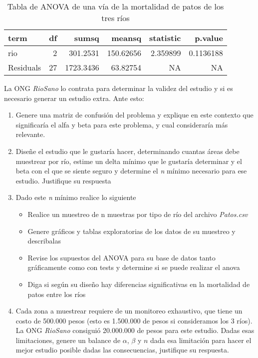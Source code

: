 \documentclass[]{book}
\providecommand{\tightlist}{%
  \setlength{\itemsep}{0pt}\setlength{\parskip}{0pt}}
\begin{document}
\begin{table}

\caption{\label{tab:unnamed-chunk-29}Tabla de ANOVA de una vía de la mortalidad de patos de los tres ríos}
\centering
\begin{tabular}[t]{l|r|r|r|r|r}
\hline
term & df & sumsq & meansq & statistic & p.value\\
\hline
rio & 2 & 301.2531 & 150.62656 & 2.359899 & 0.1136188\\
\hline
Residuals & 27 & 1723.3436 & 63.82754 & NA & NA\\
\hline
\end{tabular}
\end{table}

La ONG \emph{RioSano} lo contrata para determinar la validez del estudio
y si es necesario generar un estudio extra. Ante esto:

\begin{enumerate}
\def\labelenumi{\arabic{enumi}.}
\item
  Genere una matriz de confusión del problema y explique en este
  contexto que significaría el alfa y beta para este problema, y cual
  consideraría más relevante.
\item
  Diseñe el estudio que le gustaría hacer, determinando cuantas áreas
  debe muestrear por río, estime un delta mínimo que le gustaría
  determinar y el beta con el que se siente seguro y determine el
  \emph{n} mínimo necesario para ese estudio. Justifique su respuesta
\item
  Dado este \emph{n} mínimo realice lo siguiente

  \begin{itemize}
  \tightlist
  \item
    Realice un muestreo de n muestras por tipo de río del archivo
    \emph{Patos.csv}
  \item
    Genere gráficos y tablas exploratorias de los datos de su muestreo y
    describalas
  \item
    Revise los supuestos del ANOVA para su base de datos tanto
    gráficamente como con tests y determine si se puede realizar el
    anova
  \item
    Diga si según su diseño hay diferencias significativas en la
    mortalidad de patos entre los ríos
  \end{itemize}
\item
  Cada zona a muestrear requiere de un monitoreo exhaustivo, que tiene
  un costo de 500.000 pesos (esto es 1.500.000 de pesos si consideramos
  los 3 ríos). La ONG \emph{RioSano} consiguió 20.000.000 de pesos para
  este estudio. Dadas esas limitaciones, genere un balance de
  \(\alpha\), \(\beta\) y \(n\) dada esa limitación para hacer el mejor
  estudio posible dadas las consecuencias, justifique su respuesta.
\end{enumerate}
\end{document}
